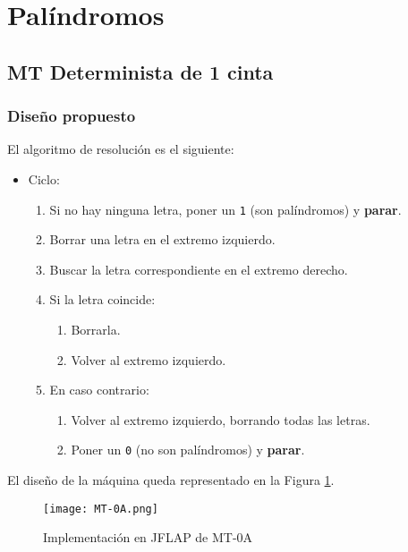 \section{Palíndromos}


\subsection{MT Determinista de 1 cinta}

\subsubsection*{Diseño propuesto}
El algoritmo de resolución es el siguiente:

\begin{itemize}
    \item Ciclo:
    \begin{enumerate}[1.]
        \item Si no hay ninguna letra, poner un \texttt{1} (son palíndromos) y \textbf{parar}.
        \item Borrar una letra en el extremo izquierdo.
        \item Buscar la letra correspondiente en el extremo derecho.
        \item Si la letra coincide:
        \begin{enumerate}[1.]
            \item Borrarla.
            \item Volver al extremo izquierdo.
        \end{enumerate}
        \item En caso contrario:
        \begin{enumerate}[1.]
            \item Volver al extremo izquierdo, borrando todas las letras.
            \item Poner un \texttt{0} (no son palíndromos) y \textbf{parar}.
        \end{enumerate}
    \end{enumerate}
\end{itemize}

El diseño de la máquina queda representado en la Figura \ref{fig:MT-0A}.

\begin{figure}[h]
    \centering
    \texttt{[image: MT-0A.png]}
    \caption{Implementación en JFLAP de MT-0A}
    \label{fig:MT-0A}
\end{figure}


